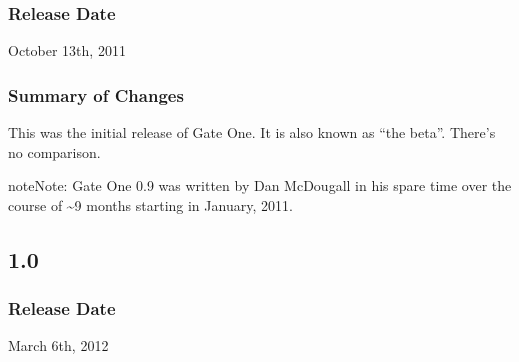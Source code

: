 \documentclass[letterpaper,10pt,openany]{sphinxmanual}
\begin{document}
\subsubsection{Release Date}
\label{ReleaseNotes/index:release-date}
October 13th, 2011


\subsubsection{Summary of Changes}
\label{ReleaseNotes/index:summary-of-changes}
This was the initial release of Gate One.  It is also known as ``the beta''.  There's no comparison.

\begin{notice}{note}{Note:}
Gate One 0.9 was written by Dan McDougall in his spare time over the course of \textasciitilde{}9 months starting in January, 2011.
\end{notice}


\subsection{1.0}
\label{ReleaseNotes/index:id2}

\subsubsection{Release Date}
\label{ReleaseNotes/index:id3}
March 6th, 2012
\end{document}
